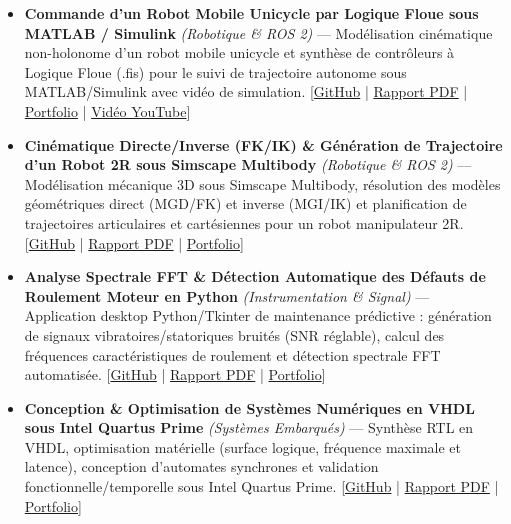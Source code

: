 \documentclass[10pt,a4paper]{article}
\begin{document}
\begin{itemize}
\item \textbf{Commande d'un Robot Mobile Unicycle par Logique Floue sous MATLAB / Simulink} \textit{(Robotique \& ROS 2)} --- Modélisation cinématique non-holonome d'un robot mobile unicycle et synthèse de contrôleurs à Logique Floue (.fis) pour le suivi de trajectoire autonome sous MATLAB/Simulink avec vidéo de simulation. [\href{https://github.com/scidelo-andriasahy/unicycle-mobile-robot-fuzzy-simulink}{GitHub} | \href{https://scidelo-andriasahy.github.io/assets/pdfs/Rapport_Robot_Mobile_Unicycle_Flou.pdf}{Rapport PDF} | \href{https://scidelo-andriasahy.github.io/?project=14}{Portfolio} | \href{https://youtu.be/6zdbtt15iCY}{Vid\'eo YouTube}]
\item \textbf{Cinématique Directe/Inverse (FK/IK) \& Génération de Trajectoire d'un Robot 2R sous Simscape Multibody} \textit{(Robotique \& ROS 2)} --- Modélisation mécanique 3D sous Simscape Multibody, résolution des modèles géométriques direct (MGD/FK) et inverse (MGI/IK) et planification de trajectoires articulaires et cartésiennes pour un robot manipulateur 2R. [\href{https://github.com/scidelo-andriasahy/robot-2r-fk-ik-trajectory-simscape}{GitHub} | \href{https://scidelo-andriasahy.github.io/assets/pdfs/Rapport_Robot_2R_FK_IK_Simscape.pdf}{Rapport PDF} | \href{https://scidelo-andriasahy.github.io/?project=15}{Portfolio}]
\item \textbf{Analyse Spectrale FFT \& Détection Automatique des Défauts de Roulement Moteur en Python} \textit{(Instrumentation \& Signal)} --- Application desktop Python/Tkinter de maintenance prédictive : génération de signaux vibratoires/statoriques bruités (SNR réglable), calcul des fréquences caractéristiques de roulement et détection spectrale FFT automatisée. [\href{https://github.com/scidelo-andriasahy/motor-bearing-fault-detection-python-fft}{GitHub} | \href{https://scidelo-andriasahy.github.io/assets/pdfs/Rapport_Detection_Defauts_Roulement_Python.pdf}{Rapport PDF} | \href{https://scidelo-andriasahy.github.io/?project=16}{Portfolio}]
\item \textbf{Conception \& Optimisation de Systèmes Numériques en VHDL sous Intel Quartus Prime} \textit{(Systèmes Embarqués)} --- Synthèse RTL en VHDL, optimisation matérielle (surface logique, fréquence maximale et latence), conception d'automates synchrones et validation fonctionnelle/temporelle sous Intel Quartus Prime. [\href{https://github.com/scidelo-andriasahy/vhdl-digital-systems-quartus-optimization}{GitHub} | \href{https://scidelo-andriasahy.github.io/assets/pdfs/Rapport_VHDL_Quartus_Performance.pdf}{Rapport PDF} | \href{https://scidelo-andriasahy.github.io/?project=17}{Portfolio}]

\end{itemize}
\end{document}
